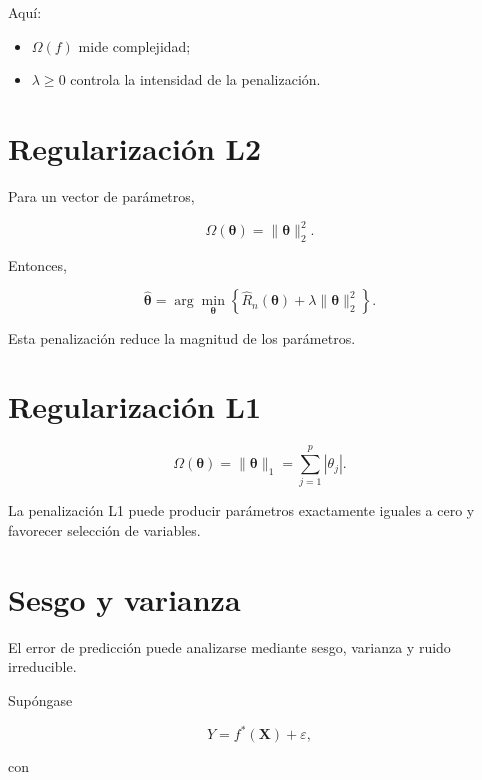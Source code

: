 \documentclass[
  spanish,
  10.5pt,
  letterpaper,
  DIV=11,
  numbers=noendperiod,
  oneside,
  open=any]{scrreprt}
\providecommand{\tightlist}{%
  \setlength{\itemsep}{0pt}\setlength{\parskip}{0pt}}
\theoremstyle{definition}
\theoremstyle{definition}
\theoremstyle{plain}
\theoremstyle{remark}
\begin{document}
Aquí:

\begin{itemize}
\tightlist
\item
  \(\Omega(f)\) mide complejidad;
\item
  \(\lambda\geq 0\) controla la intensidad de la penalización.
\end{itemize}

\section*{Regularización L2}\label{regularizaciuxf3n-l2}


Para un vector de parámetros,

\[
\Omega(\boldsymbol{\theta})
=
\|\boldsymbol{\theta}\|_2^2.
\]

Entonces,

\[
\widehat{\boldsymbol{\theta}}
=
\arg\min_{\boldsymbol{\theta}}
\left\{
\widehat{R}_n(\boldsymbol{\theta})
+
\lambda
\|\boldsymbol{\theta}\|_2^2
\right\}.
\]

Esta penalización reduce la magnitud de los parámetros.

\section*{Regularización L1}\label{regularizaciuxf3n-l1}


\[
\Omega(\boldsymbol{\theta})
=
\|\boldsymbol{\theta}\|_1
=
\sum_{j=1}^{p}
|\theta_j|.
\]

La penalización L1 puede producir parámetros exactamente iguales a cero
y favorecer selección de variables.

\section*{Sesgo y varianza}\label{sesgo-y-varianza}


El error de predicción puede analizarse mediante sesgo, varianza y ruido
irreducible.

Supóngase

\[
Y=f^{*}(\mathbf{X})+\varepsilon,
\]

con
\end{document}
